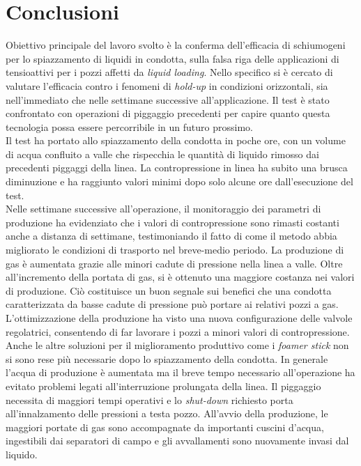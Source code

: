 \chapter*{Conclusioni}\thispagestyle{empty} 
Obiettivo principale del lavoro svolto è la conferma dell'efficacia di schiumogeni per lo spiazzamento di liquidi in condotta, sulla falsa riga delle applicazioni di tensioattivi per i pozzi affetti da \textit{liquid loading}. Nello specifico si è cercato di valutare l'efficacia contro i fenomeni di \textit{hold-up} in condizioni orizzontali, sia nell'immediato che nelle settimane successive all'applicazione. Il test è stato confrontato con operazioni di piggaggio precedenti per capire quanto questa tecnologia possa essere percorribile in un futuro prossimo.\\
Il test ha portato allo spiazzamento della condotta in poche ore, con un volume di acqua confluito a valle che rispecchia le quantità di liquido rimosso dai precedenti piggaggi della linea. La contropressione in linea ha subito una brusca diminuzione e ha raggiunto valori minimi dopo solo alcune ore dall'esecuzione del test.\\
Nelle settimane successive all'operazione, il monitoraggio dei parametri di produzione ha evidenziato che i valori di contropressione sono rimasti costanti anche a distanza di settimane, testimoniando il fatto di come il metodo abbia migliorato le condizioni di trasporto nel breve-medio periodo.
La produzione di gas è aumentata grazie alle minori cadute di pressione nella linea a valle. Oltre all'incremento della portata di gas, si è ottenuto una maggiore costanza nei valori di produzione. Ciò costituisce un buon segnale sui benefici che una condotta caratterizzata da basse cadute di pressione può portare ai relativi pozzi a gas. L'ottimizzazione della produzione ha visto una nuova configurazione delle valvole regolatrici, consentendo di far lavorare i pozzi a minori valori di contropressione. Anche le altre soluzioni per il miglioramento produttivo come i \textit{foamer stick} non si sono rese più necessarie dopo lo spiazzamento della condotta.
In generale l'acqua di produzione è aumentata ma il breve tempo necessario all'operazione ha evitato problemi legati all'interruzione prolungata della linea. Il piggaggio necessita di maggiori tempi operativi e lo \textit{shut-down}  richiesto porta all'innalzamento delle pressioni a testa pozzo. All'avvio della produzione, le maggiori portate di gas sono accompagnate da importanti cuscini d'acqua, ingestibili dai separatori di campo e gli avvallamenti sono nuovamente invasi dal liquido.\\
